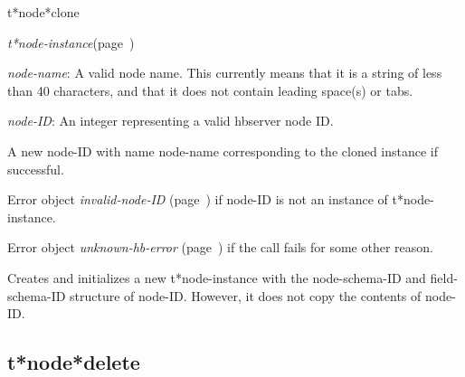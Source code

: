 \begin{description}
\item [Name:]  t*node*clone

\item [Class:] {\sl t*node-instance}\hfill(page~\pageref{t*node-instance})

\item [Parameters:]
\item {\sl node-name}:  
A valid node name. This currently means that it is a
string of less than 40 characters, and that it does
not contain leading space(s) or tabs.

\item {\sl node-ID}:   An integer representing
a valid hbserver node ID.


\item [Return-value:]
A new node-ID with name node-name corresponding to 
the cloned instance if successful.

Error object {\sl invalid-node-ID} (page~\pageref{invalid-node-ID}) if node-ID is not
an instance of t*node-instance.

Error object {\sl unknown-hb-error} (page~\pageref{unknown-hb-error}) if the call fails
for some other reason. 

\item [Description:]

Creates and initializes a new t*node-instance with 
the node-schema-ID and field-schema-ID structure of 
node-ID. However, it does not copy the contents of 
node-ID.

\item [Public:]



\end{description}
\horizontalline

\subsection{t*node*delete}
\label{t*node*delete}

